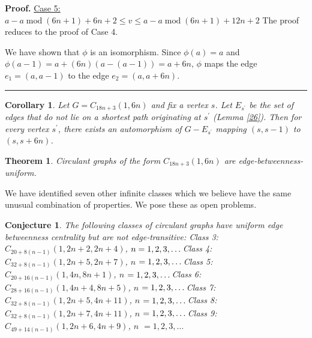 \documentclass{article}%
\newtheorem{theorem}{Theorem}[section]
\newtheorem{conjecture}{Conjecture}[section]
\newtheorem{corollary}{Corollary}[section]
\newenvironment{proof}[1][Proof]{\textbf{#1.} }{\ \rule{0.5em}{0.5em}}
\begin{document}
\begin{proof}
\noindent\newline\underline{Case 5:} $a-a\operatorname{mod}(6n+1)+6n+2\leq
v\leq a-a\operatorname{mod}(6n+1)+12n+2$ \noindent\newline The proof reduces
to the proof of Case 4.

\noindent\newline We have shown that $\phi$ is an isomorphism. Since
$\phi(a)=a$ and $\phi(a-1)=a+(6n)(a-(a-1))=a+6n$, $\phi$ maps the edge
$e_{1}=(a,a-1)$ to the edge $e_{2}=(a,a+6n)$.
\end{proof}

\bigskip

\begin{corollary}
Let $G=C_{18n+3}(1,6n)$ and fix a vertex $s$. Let $E_{s^{\prime}}$ be the set
of edges that do not lie on a shortest path originating at $s^{\prime}$ (Lemma
\ref{26}). Then for every vertex $s^{\prime}$, there exists an automorphism of
$G-E_{s^{\prime}}$ mapping $(s,s-1)$ to $(s,s+6n)$.
\end{corollary}

\begin{theorem}
Circulant graphs of the form $C_{18n+3}(1,6n)$ are edge-betweenness-uniform.
\end{theorem}

\noindent\newline We have identified seven other infinite classes which we
believe have the same unusual combination of properties. We pose these as open problems.

\begin{conjecture}
The following classes of circulant graphs have uniform edge betweenness
centrality but are not edge-transitive: \newline\newline Class 3:
$C_{20+8(n-1)}(1,2n+2,2n+4)$, $n=1,2,3,\dots\newline$\newline Class 4:
$C_{32+8(n-1)}(1,2n+5,2n+7)$, $n$ $=1,2,3,\dots\newline$\newline Class 5:
$C_{20+16(n-1)}(1,4n,8n+1)$, $n$ $=1,2,3,\dots\newline$\newline Class 6:
$C_{28+16(n-1)}(1,4n+4,8n+5)$, $n$ $=1,2,3,\dots\newline$\newline Class 7:
$C_{32+8(n-1)}(1,2n+5,4n+11)$, $n$ $=1,2,3,\dots\newline$\newline Class 8:
$C_{32+8(n-1)}(1,2n+7,4n+11)$, $n$ $=1,2,3,\dots\newline$\newline Class 9:
$C_{49+14(n-1)}(1,2n+6,4n+9)$, $n$ $=1,2,3,\dots$
\end{conjecture}
\end{document}
